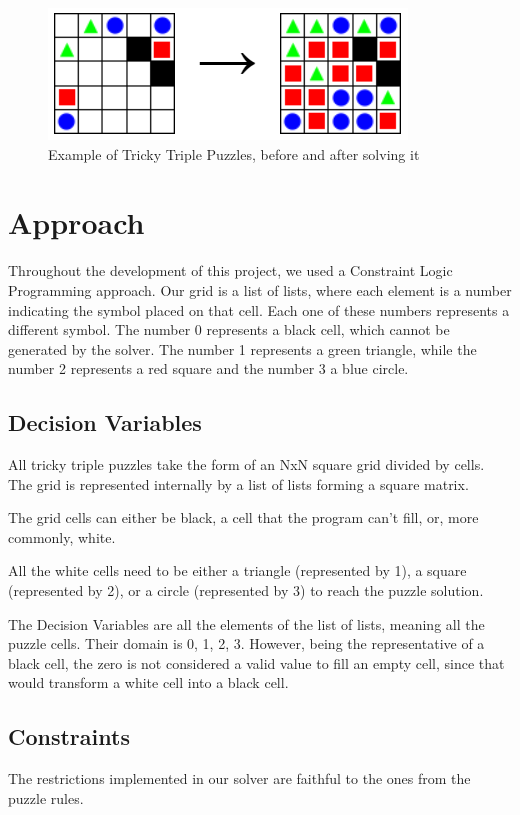 \documentclass[runningheads]{llncs}
\begin{document}
\begin{figure}
    \centering
    \includegraphics[scale=0.7]{img/tricky-triple.png}
    \caption{Example of Tricky Triple Puzzles, before and after solving it} \label{fig1}
\end{figure}

\section{Approach}
Throughout the development of this project, we used a Constraint Logic Programming approach.
Our grid is a list of lists, where each element is a number indicating the symbol placed on that cell.
Each one of these numbers represents a different symbol.
The number 0 represents a black cell, which cannot be generated by the solver.
The number 1 represents a green triangle,
    while the number 2 represents a red square and the number 3 a blue circle.

\subsection{Decision Variables}
All tricky triple puzzles take the form of an NxN square grid divided by cells.
The grid is represented internally by a list of lists forming a square matrix.

The grid cells can either be black, a cell that the program can't fill, or, more commonly, white.

All the white cells need to be either a triangle (represented by 1), a square (represented by 2),
    or a circle (represented by 3) to reach the puzzle solution.

The Decision Variables are all the elements of the list of lists, meaning all the puzzle cells.
Their domain is {0, 1, 2, 3}. However, being the representative of a black cell,
    the zero is not considered a valid value to fill an empty cell,
    since that would transform a white cell into a black cell.

\subsection{Constraints}
The restrictions implemented in our solver are faithful to the ones from the puzzle rules.
\end{document}
